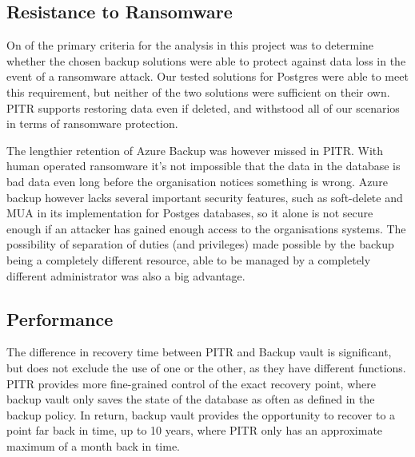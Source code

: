 \subsection{Resistance to Ransomware}
On of the primary criteria for the analysis in this project was to determine whether the chosen backup solutions were able to protect against data loss in the event of a ransomware attack. Our tested solutions for Postgres were able to meet this requirement, but neither of the two solutions were sufficient on their own. PITR supports restoring data even if deleted, and withstood all of our scenarios in terms of ransomware protection. 

The lengthier retention of Azure Backup was however missed in PITR. With human operated ransomware it's not impossible that the data in the database is bad data even long before the organisation notices something is wrong. Azure backup however lacks several important security features, such as soft-delete and MUA in its implementation for Postges databases, so it alone is not secure enough if an attacker has gained enough access to the organisations systems. The possibility of separation of duties (and privileges) made possible by the backup being a completely different resource, able to be managed by a completely different administrator was also a big advantage.  


\subsection{Performance}
The difference in recovery time between PITR and Backup vault is significant, but does not exclude the use of one or the other, as they have different functions. PITR provides more fine-grained control of the exact recovery point, where backup vault only saves the state of the database as often as defined in the backup policy. In return, backup vault provides the opportunity to recover to a point far back in time, up to 10 years, where PITR only has an approximate maximum of a month back in time.


